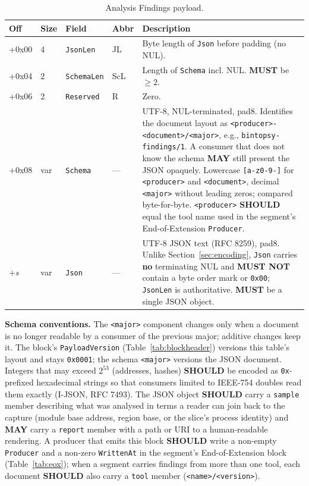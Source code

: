 \documentclass[11pt,a4paper]{article}
\newcommand{\MUST}{\textbf{MUST}}
\newcommand{\MUSTNOT}{\textbf{MUST NOT}}
\newcommand{\SHOULD}{\textbf{SHOULD}}
\newcommand{\MAY}{\textbf{MAY}}
\newcommand{\hex}[1]{\texttt{0x#1}}
\newcommand{\field}[1]{\texttt{#1}}
\begin{document}
\begin{table}[H]\centering\caption{Analysis Findings payload.}\label{tab:findings}\small
\begin{tabular}{M M l l p{5.5cm}}\toprule\textbf{Off}&\textbf{Size}&\textbf{Field}&\textbf{Abbr}&\textbf{Description}\\\midrule
+0x00 & 4 & \field{JsonLen} & JL & Byte length of \field{Json} before padding (no NUL). \\
+0x04 & 2 & \field{SchemaLen} & ScL & Length of \field{Schema} incl. NUL. \MUST{} be $\geq 2$. \\
+0x06 & 2 & \field{Reserved} & R & Zero. \\
+0x08 & var & \field{Schema} & --- & UTF-8, NUL-terminated, pad8. Identifies the document layout as \texttt{<producer>-<document>/<major>}, e.g., \texttt{bintopsy-findings/1}. A consumer that does not know the schema \MAY{} still present the JSON opaquely. Lowercase \texttt{[a-z0-9-]} for \texttt{<producer>} and \texttt{<document>}, decimal \texttt{<major>} without leading zeros; compared byte-for-byte. \texttt{<producer>} \SHOULD{} equal the tool name used in the segment's End-of-Extension \field{Producer}. \\
$+s$ & var & \field{Json} & --- & UTF-8 JSON text (RFC 8259), pad8. Unlike Section~\ref{sec:encoding}, \field{Json} carries \textbf{no} terminating NUL and \MUSTNOT{} contain a byte order mark or \hex{00}; \field{JsonLen} is authoritative. \MUST{} be a single JSON object. \\\bottomrule
\end{tabular}\end{table}

\noindent\textbf{Schema conventions.} The \texttt{<major>} component changes only when a document is no longer readable by a consumer of the previous major; additive changes keep it. The block's \field{PayloadVersion} (Table~\ref{tab:blockheader}) versions this table's layout and stays \hex{0001}; the schema \texttt{<major>} versions the JSON document. Integers that may exceed $2^{53}$ (addresses, hashes) \SHOULD{} be encoded as \texttt{0x}-prefixed hexadecimal strings so that consumers limited to IEEE-754 doubles read them exactly (I-JSON, RFC 7493). The JSON object \SHOULD{} carry a \texttt{sample} member describing what was analysed in terms a reader can join back to the capture (module base address, region base, or the slice's process identity) and \MAY{} carry a \texttt{report} member with a path or URI to a human-readable rendering. A producer that emits this block \SHOULD{} write a non-empty \field{Producer} and a non-zero \field{WrittenAt} in the segment's End-of-Extension block (Table~\ref{tab:eox}); when a segment carries findings from more than one tool, each document \SHOULD{} also carry a \texttt{tool} member (\texttt{<name>/<version>}).
\end{document}
